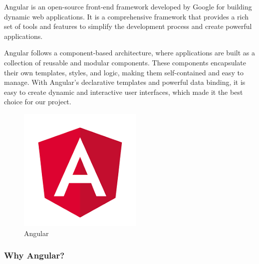 \documentclass[
12pt,
oneside, 
onehalfspacing, 
nolistspacing, 
parskip, 
chapterinoneline, 
]{AASTCOMPUTER}
\begin{document}
Angular is an open-source front-end framework developed by Google for building dynamic web applications. It is a comprehensive framework that provides a rich set of tools and features to simplify the development process and create powerful applications.

Angular follows a component-based architecture, where applications are built as a collection of reusable and modular components. These components encapsulate their own templates, styles, and logic, making them self-contained and easy to manage. With Angular's declarative templates and powerful data binding, it is easy to create dynamic and interactive user interfaces, which made it the best choice for our project.

\begin{figure}[!ht]
	\centering
	\includegraphics[scale=0.5]{Figures/FrontEnd/AdminConsole/angular.png}
  	\caption{Angular}
  	\label{fig:Angular}
\end{figure}

\subsubsection{Why Angular?}
\end{document}
